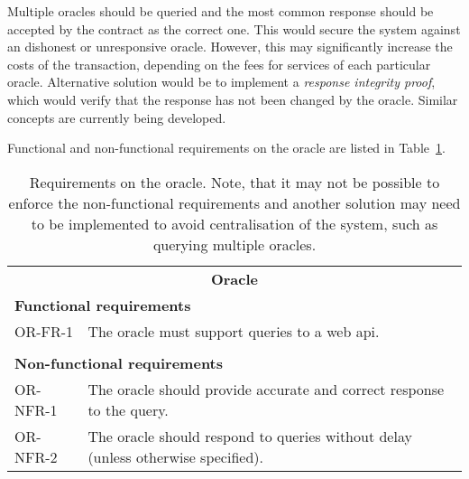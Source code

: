 Multiple oracles should be queried and the most common response should be accepted by the contract as the correct one. This would secure the system against an dishonest or unresponsive oracle. However, this may significantly increase the costs of the transaction, depending on the fees for services of each particular oracle. Alternative solution would be to implement a \textit{response integrity proof}, which would verify that the response has not been changed by the oracle. Similar concepts are currently being developed\footnotemark.
% 

Functional and non-functional requirements on the oracle are listed in Table~\ref{tab:reqs-oracle}.

\begin{table}[ht]
    \centering
    \begin{tabularx}{\textwidth}{|l X|}
    \hline
        \multicolumn{2}{|c|}{\textbf{Oracle}}\\
        \multicolumn{2}{|l|}{\textbf{Functional requirements}}\\
        OR-FR-1&The oracle must support queries to a web \acrshort{api}.\\
        &\\
        \multicolumn{2}{|l|}{\textbf{Non-functional requirements}}\\
        OR-NFR-1&The oracle should provide accurate and correct response to the query.\\
        OR-NFR-2&The oracle should respond to queries without delay (unless otherwise specified).\\
    \hline
    \end{tabularx}
    \caption{Requirements on the oracle. Note, that it may not be possible to enforce the non-functional requirements and another solution may need to be implemented to avoid centralisation of the system, such as querying multiple oracles.}
    \label{tab:reqs-oracle}
\end{table}

